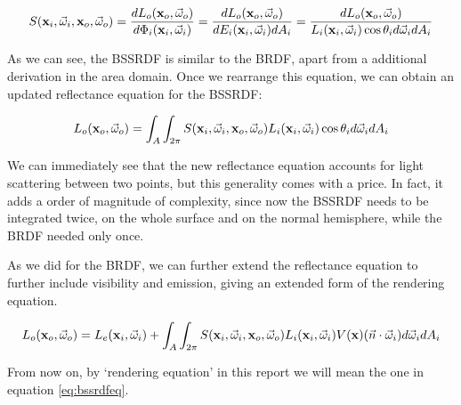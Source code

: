 $$
S(\mathbf{x}_i, \vec{\omega}_i, \mathbf{x}_o, \vec{\omega}_o) = \frac{d L_o(\mathbf{x}_o,\vec{\omega}_o)}{d \Phi_i(\mathbf{x}_i,\vec{\omega}_i)} = \frac{d L_o(\mathbf{x}_o,\vec{\omega}_o)}{d E_i(\mathbf{x}_i,\vec{\omega}_i) d A_i} = \frac{d L_o(\mathbf{x}_o,\vec{\omega}_o)}{L_i(\mathbf{x}_i,\vec{\omega}_i) \cos \theta_i d\vec{\omega}_i d A_i}  
$$

As we can see, the BSSRDF is similar to the BRDF, apart from a additional derivation in the area domain. Once we rearrange this equation, we can obtain an updated reflectance equation for the BSSRDF:

$$
L_o(\mathbf{x}_o,\vec{\omega}_o) = \int_A \int_{2\pi} S(\mathbf{x}_i, \vec{\omega}_i, \mathbf{x}_o, \vec{\omega}_o) L_i(\mathbf{x}_i,\vec{\omega}_i) \cos \theta_i d\vec{\omega}_i d A_i
$$

We can immediately see that the new reflectance equation accounts for light scattering between two points, but this generality comes with a price. In fact, it adds a order of magnitude of complexity, since now the BSSRDF needs to be integrated twice, on the whole surface and on the normal hemisphere, while the BRDF needed only once. 

As we did for the BRDF, we can further extend the reflectance equation to further include visibility and emission, giving an extended form of the rendering equation. 

\begin{equation}
L_o(\mathbf{x}_o,\vec{\omega}_o) = L_e(\mathbf{x}_i,\vec{\omega}_i) + \int_A \int_{2\pi} S(\mathbf{x}_i, \vec{\omega}_i, \mathbf{x}_o, \vec{\omega}_o) L_i(\mathbf{x}_i,\vec{\omega}_i) V(\mathbf{x}) (\vec{n} \cdot \vec{\omega}_i) d\vec{\omega}_i d A_i
\label{eq:bssrdfeq}
\end{equation}

From now on, by `rendering equation' in this report we will mean the one in equation \ref{eq:bssrdfeq}. 

